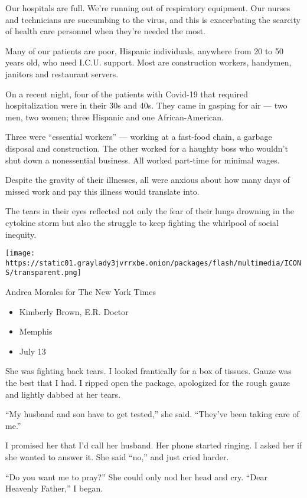 Our hospitals are full. We're running out of respiratory equipment. Our
nurses and technicians are succumbing to the virus, and this is
exacerbating the scarcity of health care personnel when they're needed
the most.

Many of our patients are poor, Hispanic individuals, anywhere from 20 to
50 years old, who need I.C.U. support. Most are construction workers,
handymen, janitors and restaurant servers.

On a recent night, four of the patients with Covid-19 that required
hospitalization were in their 30s and 40s. They came in gasping for air
--- two men, two women; three Hispanic and one African-American.

Three were ``essential workers'' --- working at a fast-food chain, a
garbage disposal and construction. The other worked for a haughty boss
who wouldn't shut down a nonessential business. All worked part-time for
minimal wages.

Despite the gravity of their illnesses, all were anxious about how many
days of missed work and pay this illness would translate into.

The tears in their eyes reflected not only the fear of their lungs
drowning in the cytokine storm but also the struggle to keep fighting
the whirlpool of social inequity.

\texttt{[image: https://static01.graylady3jvrrxbe.onion/packages/flash/multimedia/ICONS/transparent.png]}

Andrea Morales for The New York Times

\begin{itemize}
\tightlist
\item
  Kimberly Brown, E.R. Doctor
\item
  Memphis
\item
  July 13
\end{itemize}

She was fighting back tears. I looked frantically for a box of tissues.
Gauze was the best that I had. I ripped open the package, apologized for
the rough gauze and lightly dabbed at her tears.

``My husband and son have to get tested,'' she said. ``They've been
taking care of me.''

I promised her that I'd call her husband. Her phone started ringing. I
asked her if she wanted to answer it. She said ``no,'' and just cried
harder.

``Do you want me to pray?'' She could only nod her head and cry. ``Dear
Heavenly Father,'' I began.


